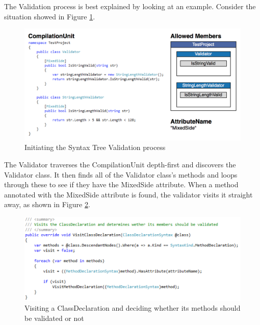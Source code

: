 		The Validation process is best explained by looking at an example. Consider the situation showed in Figure \ref{fig:mixedSideValidationExample}. 

		\begin{figure}[H]
			\begin{center}
				\centerline{\includegraphics[width=14cm]{resources/images/MixedSideValidationExample.png}}
			\end{center}
			\caption{Initiating the Syntax Tree Validation process}
			\label{fig:mixedSideValidationExample}
		\end{figure}		
		
		The Validator traverses the CompilationUnit depth-first and discovers the Validator class. It then finds all of the Validator class's methods and loops through these to see if they have the MixedSide attribute. When a method annotated with the MixedSide attribute is found, the validator visits it straight away, as shown in Figure \ref{fig:ValidatorVisitClassDeclaration}. 

		\begin{figure}[H]
			\begin{center}
				\centerline{\includegraphics[width=14cm]{resources/images/ValidatorVisitClassDeclaration.png}}
			\end{center}
			\caption{Visiting a ClassDeclaration and deciding whether its methods should be validated or not}
			\label{fig:ValidatorVisitClassDeclaration}
		\end{figure}

